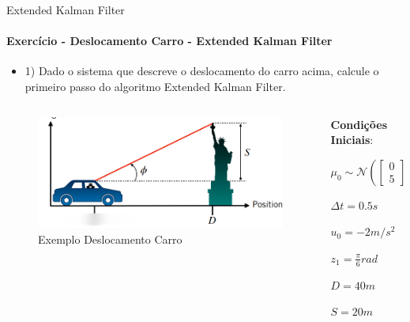 \documentclass[aspectratio=169]{beamer}
\begin{document}
\begin{frame}[c]{Extended Kalman Filter}
    \framesubtitle{Exercício - Deslocamento Carro - Extended Kalman Filter}
    
    \begin{itemize}
        \item 1) Dado o sistema que descreve o deslocamento do carro acima,
        calcule o primeiro passo do algoritmo Extended Kalman Filter.
    \end{itemize}

    \begin{columns}
        \begin{column}[c]{0.4\textwidth}
            \begin{figure}
                \centering
                \includegraphics[width=1\textwidth]{./images/kalman_car2.png}
                \caption{Exemplo Deslocamento Carro}
            \end{figure}
            
        \end{column}
        \begin{column}[c]{0.6\textwidth}
            
            \textbf{Condições Iniciais}:

            \begin{equation*}
                \mu_0 \sim \mathcal{N} \left( 
                    \begin{bmatrix}
                        0 \\ 5
                    \end{bmatrix}, 
                    \begin{bmatrix}
                        0.01 & 0 \\
                        0 & 1
                    \end{bmatrix} \right)
            \end{equation*}

            $\Delta t = 0.5s$

            $u_0 = -2m/s^2$

           $z_1 = \frac{\pi}{6} rad$ 

           $D = 40m$

           $S = 20m$

        \end{column}
    \end{columns}
\end{frame}
\end{document}
